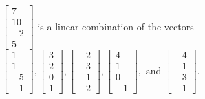 \begin{exercise}
\begin{exerciseStatement}
  \end{exerciseStatement}
  \begin{exerciseAnswer}
   \(\left[\begin{array}{c}
7 \\
10 \\
-2 \\
5
\end{array}\right]\) 
  	 is  
	a linear combination of the vectors \(\left[\begin{array}{c}
1 \\
1 \\
-5 \\
-1
\end{array}\right] , \left[\begin{array}{c}
3 \\
2 \\
0 \\
1
\end{array}\right] , \left[\begin{array}{c}
-2 \\
-3 \\
-1 \\
-2
\end{array}\right] , \left[\begin{array}{c}
4 \\
1 \\
0 \\
-1
\end{array}\right] , \text{ and } \left[\begin{array}{c}
-4 \\
-1 \\
-3 \\
-1
\end{array}\right]\).

	
  


  \end{exerciseAnswer}
\end{exercise}